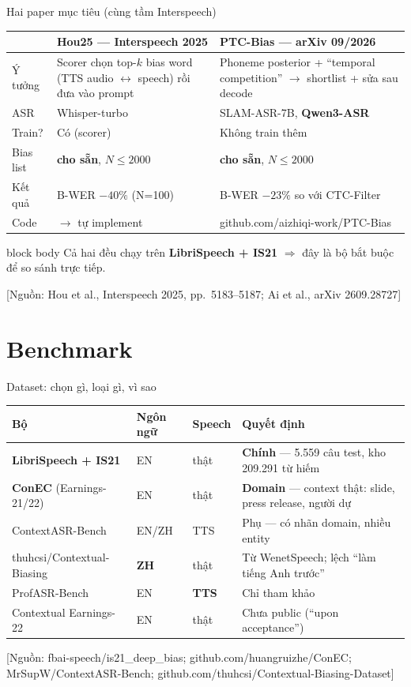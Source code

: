 \documentclass[aspectratio=169,xcolor=table]{beamer}
\newcommand{\hi}[1]{\textcolor{Primary}{\textbf{#1}}}
\newcommand{\bad}[1]{\textcolor{RiskRed}{\textbf{#1}}}
\newcommand{\src}[1]{{\tiny\color{TextGray}[Nguồn: #1]}}
\newcommand{\cmark}{\textcolor{GoodGreen}{\ding{51}}}
\newcommand{\xmark}{\textcolor{RiskRed}{\ding{55}}}
\newcommand{\pmark}{\textcolor{Accent!85!black}{\ding{108}}}
\begin{document}
\begin{frame}{Hai paper mục tiêu (cùng tầm Interspeech)}
\small\renewcommand{\arraystretch}{1.22}
\begin{tabular}{@{}p{2.6cm}p{4.9cm}p{5.2cm}@{}}
\toprule
& \textbf{Hou25} --- Interspeech 2025 & \textbf{PTC-Bias} --- arXiv 09/2026 \\
\midrule
Ý tưởng & Scorer chọn top-$k$ bias word (TTS audio $\leftrightarrow$ speech) rồi đưa vào prompt & Phoneme posterior + ``temporal competition'' $\rightarrow$ shortlist + sửa sau decode \\
ASR & Whisper-turbo & SLAM-ASR-7B, \hi{Qwen3-ASR} \\
Train? & Có (scorer) & Không train thêm \\
Bias list & \bad{cho sẵn}, $N\le 2000$ & \bad{cho sẵn}, $N\le 2000$ \\
Kết quả & B-WER $-40\%$ (N=100) & B-WER $-23\%$ so với CTC-Filter \\
Code & \xmark{} $\rightarrow$ tự implement & \cmark{} github.com/aizhiqi-work/PTC-Bias \\
\bottomrule
\end{tabular}
\vfill
\begin{beamercolorbox}[sep=0.40em,center,rounded=true]{block body}
\small Cả hai đều chạy trên \hi{LibriSpeech + IS21} $\Rightarrow$ đây là bộ bắt buộc để so sánh trực tiếp.
\end{beamercolorbox}
\vfill\src{Hou et al., Interspeech 2025, pp.~5183--5187; Ai et al., arXiv 2609.28727}
\end{frame}

\section{Benchmark}
\begin{frame}{Dataset: chọn gì, loại gì, vì sao}
\small\renewcommand{\arraystretch}{1.2}
\begin{tabular}{@{}p{3.4cm}p{1.6cm}p{1.6cm}p{5.6cm}@{}}
\toprule
\textbf{Bộ} & \textbf{Ngôn ngữ} & \textbf{Speech} & \textbf{Quyết định} \\
\midrule
\hi{LibriSpeech + IS21} & EN & thật & \cmark{} \textbf{Chính} --- 5.559 câu test, kho 209.291 từ hiếm \\
\hi{ConEC} (Earnings-21/22) & EN & thật & \cmark{} \textbf{Domain} --- context thật: slide, press release, người dự \\
ContextASR-Bench & EN/ZH & TTS & \pmark{} Phụ --- có nhãn domain, nhiều entity \\
thuhcsi/Contextual-Biasing & \bad{ZH} & thật & \xmark{} Từ WenetSpeech; lệch ``làm tiếng Anh trước'' \\
ProfASR-Bench & EN & \bad{TTS} & \xmark{} Chỉ tham khảo \\
Contextual Earnings-22 & EN & thật & \xmark{} Chưa public (``upon acceptance'') \\
\bottomrule
\end{tabular}
\vfill\src{fbai-speech/is21\_deep\_bias; github.com/huangruizhe/ConEC; MrSupW/ContextASR-Bench; github.com/thuhcsi/Contextual-Biasing-Dataset}
\end{frame}
\end{document}
